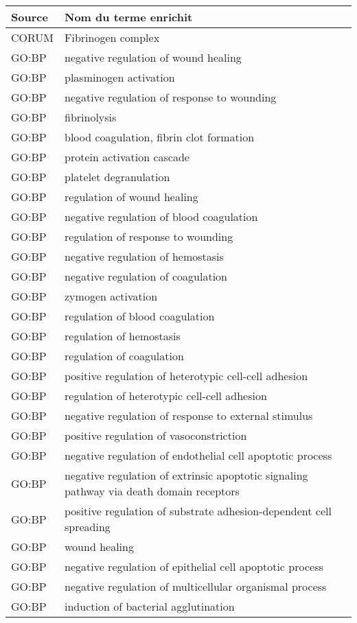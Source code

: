 \begin{longtable}{ll}
\toprule
Source & Nom du terme enrichit\\
\midrule
CORUM & Fibrinogen complex\\
GO:BP & negative regulation of wound healing\\
GO:BP & plasminogen activation\\
GO:BP & negative regulation of response to wounding\\
GO:BP & fibrinolysis\\
GO:BP & blood coagulation, fibrin clot formation\\
GO:BP & protein activation cascade\\
GO:BP & platelet degranulation\\
GO:BP & regulation of wound healing\\
GO:BP & negative regulation of blood coagulation\\
GO:BP & regulation of response to wounding\\
GO:BP & negative regulation of hemostasis\\
GO:BP & negative regulation of coagulation\\
GO:BP & zymogen activation\\
GO:BP & regulation of blood coagulation\\
GO:BP & regulation of hemostasis\\
GO:BP & regulation of coagulation\\
GO:BP & positive regulation of heterotypic cell-cell adhesion\\
GO:BP & regulation of heterotypic cell-cell adhesion\\
GO:BP & negative regulation of response to external stimulus\\
GO:BP & positive regulation of vasoconstriction\\
GO:BP & negative regulation of endothelial cell apoptotic process\\
GO:BP & negative regulation of extrinsic apoptotic signaling pathway via death domain receptors\\
GO:BP & positive regulation of substrate adhesion-dependent cell spreading\\
GO:BP & wound healing\\
GO:BP & negative regulation of epithelial cell apoptotic process\\
GO:BP & negative regulation of multicellular organismal process\\
GO:BP & induction of bacterial agglutination\\

\end{longtable}
